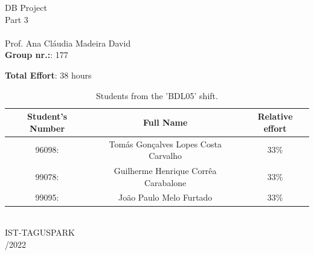 \begin{center}
\vspace{5.0cm}
%
{\FontLb DB Project} \\
\vspace{0.2cm}
%
{\FontMn Part 3} \\
\vspace{1.0cm}
{\FontLn \tlangCourse} \\
\vspace{0.3cm}
{\FontMn Prof. Ana Cláudia Madeira David} \\
\vspace{0.5cm}
\textbf{Group nr.:}: 177 \\
\begin{center}
\begin{table}[h!]
\centering
\textbf{Total Effort}: 38 hours \\
\vspace{0.6cm}
\begin{tabular}{||c c c||} 
 \hline
 Student's Number & Full Name & Relative effort  \\ [0.5ex] 
 \hline\hline
       96098: & Tomás Gonçalves Lopes Costa Carvalho & 33\% \\
       99078: & Guilherme Henrique Corrêa Carabalone & 33\% \\
       99095: & João Paulo Melo Furtado & 33\% \\

 \hline
\end{tabular}
\caption{Students from the 'BDL05' shift.}
\end{table}
\end{center}
    
\vspace{2.0cm}
{\FontMb \tlangDegree} \\
{\FontMb IST-TAGUSPARK} \\
\vspace{1.5cm}
{/2022} \\
\end{center}